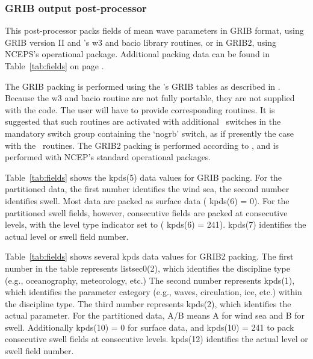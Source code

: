 \subsubsection{GRIB output post-processor} \label{sec:post_g}
\vsssub



\vspace{\baselineskip} 
\noindent
This post-processor packs fields of mean wave parameters in GRIB format, using
GRIB version II and \ncep's w3 and bacio library routines, or in GRIB2, using
NCEPS's operational package. Additional packing data can be found in
Table~\ref{tab:fields} on page \pageref{tab:fields}.

The GRIB packing is performed using the \ncep's GRIB tables as described in
\cite{rep:GRIB}. Because the w3 and bacio routine are not fully portable, they
are not supplied with the code. The user will have to provide corresponding
routines. It is suggested that such routines are activated with additional
\ws\ switches in the mandatory switch group containing the `{\F nogrb}'
switch, as if presently the case with the \ncep\ routines.  The GRIB2 packing
is performed according to \cite{rep:GRIB2}, and is performed with NCEP's
standard operational packages.

Table~\ref{tab:fields} shows the {\F kpds(5)} data values for GRIB
packing. For the partitioned data, the first number identifies the wind sea,
the second number identifies swell. Most data are packed as surface data ({\F
kpds(6) = 0}). For the partitioned swell fields, however, consecutive fields
are packed at consecutive levels, with the level type indicator set to ({\F
kpds(6) = 241}). {\F kpds(7)} identifies the actual level or swell field
number.

Table~\ref{tab:fields} shows several {\F kpds} data values for GRIB2
packing. The first number in the table represents {\F listsec0(2)}, which
identifies the discipline type (e.g., oceanography, meteorology, etc.)  The
second number represents {\F kpds(1)}, which identifies the parameter category
(e.g., waves, circulation, ice, etc.) within the discipline type.  The third
number represents {\F kpds(2)}, which identifies the actual parameter.  For
the partitioned data, A/B means A for wind sea and B for swell.  Additionally
{\F kpds(10) = 0} for surface data, and {\F kpds(10) = 241 } to pack
consecutive swell fields at consecutive levels. {\F kpds(12)} identifies the
actual level or swell field number.

